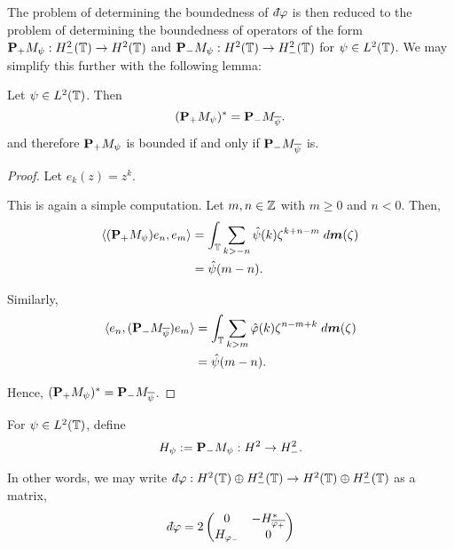 The problem of determining the boundedness of $\qd\varphi$ is then reduced to the problem of determining
the boundedness of operators of the form $\mathbf{P}_+M_\psi:H^2_-(\mathbb{T})\rightarrow H^2(\mathbb{T})$ and $\mathbf{P}_-M_\psi:H^2(\mathbb{T})\rightarrow H^2_-(\mathbb{T})$ for $\psi \in L^2(\mathbb{T})$. We may simplify
this further with the following lemma:
\begin{lemma}
    Let $\psi \in L^2(\mathbb{T})$. Then
    \begin{equation*}
        (\mathbf{P}_+M_\psi)^* = \mathbf{P}_-M_{\overline{\psi}}.
    \end{equation*}
    and therefore $\mathbf{P}_+M_\psi$ is bounded if and only if $\mathbf{P}_-M_{\overline{\psi}}$ is.
\end{lemma}
\begin{proof}
    Let $e_k(z) = z^k$. 

    This is again a simple computation. Let $m,n\in \mathbb{Z}$ with $m \geq 0$ and $n < 0$. Then,
    \begin{align*}
        \langle (\mathbf{P}_+M_\psi)e_n,e_m\rangle &= \int_{\mathbb{T}}\sum_{k>-n} \hat{\psi}(k)\zeta^{k+n-m}\;d\boldsymbol{m}(\zeta)\\
        &= \hat{\psi}(m-n).
    \end{align*}
    
    Similarly,
    \begin{align*}
        \langle e_n, (\mathbf{P}_-M_{\overline{\psi}})e_m \rangle &= \int_{\mathbb{T}} \sum_{k > m} \hat{\varphi}(k) \zeta^{n-m+k}\;d\boldsymbol{m}(\zeta)\\
                                                &= \hat{\psi}(m-n).
    \end{align*}
    
    Hence, $(\mathbf{P}_+M_\psi)^* = \mathbf{P}_-M_{\overline{\psi}}$.

\end{proof}

For $\psi \in L^2(\mathbb{T})$, define
\begin{equation*}
    H_\psi := \mathbf{P}_-M_\psi:H^2\rightarrow H^2_-.
\end{equation*}


In other words, we may write $\qd \varphi:H^2(\Circ)\oplus H^2_-(\Circ)\to H^2(\Circ)\oplus H^2_-(\Circ)$
as a matrix,
\begin{equation}
    \qd \varphi = 2\begin{pmatrix}
        0 & -H_{\overline{\varphi_+}}^*\\
        H_{\varphi_-}  & 0
    \end{pmatrix}
\end{equation}

